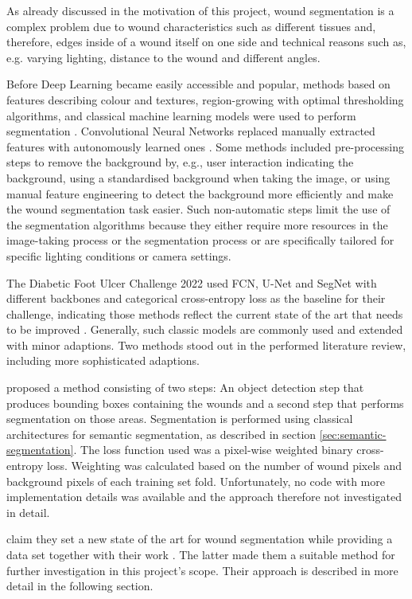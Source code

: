 As already discussed in the motivation of this project, wound segmentation is a complex problem due to wound characteristics such as different tissues and, therefore, edges inside of a wound itself on one side and technical reasons such as, e.g. varying lighting, distance to the wound and different angles. 

Before Deep Learning became easily accessible and popular, methods based on features describing colour and textures, region-growing with optimal thresholding algorithms, and classical machine learning models were used to perform segmentation \cite{Scebba2022}. Convolutional Neural Networks replaced manually extracted features with autonomously learned ones \cite{Scebba2022}. Some methods included pre-processing steps to remove the background by, e.g., user interaction indicating the background, using a standardised background when taking the image, or using manual feature engineering to detect the background more efficiently and make the wound segmentation task easier. Such non-automatic steps limit the use of the segmentation algorithms because they either require more resources in the image-taking process or the segmentation process or are specifically tailored for specific lighting conditions or camera settings.

The Diabetic Foot Ulcer Challenge 2022 used FCN, U-Net and SegNet with different backbones and categorical cross-entropy loss as the baseline for their challenge, indicating those methods reflect the current state of the art that needs to be improved \cite{DFUC2022}. Generally, such classic models are commonly used and extended with minor adaptions. Two methods stood out in the performed literature review, including more sophisticated adaptions.

\citeauthor{Scebba2022} proposed a method consisting of two steps: An object detection step that produces bounding boxes containing the wounds and a second step that performs segmentation on those areas. Segmentation is performed using classical architectures for semantic segmentation, as described in section \ref{sec:semantic-segmentation}. The loss function used was a pixel-wise weighted binary cross-entropy loss. Weighting was calculated based on the number of wound pixels and background pixels of each training set fold. Unfortunately, no code with more implementation details was available and the approach therefore not investigated in detail. \cite{Scebba2022}

\citeauthor{Oota_2023_WACV} claim they set a new state of the art for wound segmentation while providing a data set together with their work \cite{Oota_2023_WACV}. The latter made them a suitable method for further investigation in this project's scope. Their approach is described in more detail in the following section.

